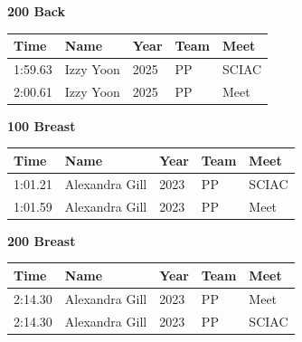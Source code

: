 \vspace{1.2em}
\noindent\begin{minipage}[t]{0.98\textwidth}
\centering
\textbf{\textcolor{teamprimary}{200 Back}}\par
\vspace{0.5em}
\centering
\small
\renewcommand{\arraystretch}{1.0}
\setlength{\tabcolsep}{4pt}
\begin{tabular}{@{}p{2.5cm}p{4.5cm}p{1.5cm}p{2.5cm}p{2.5cm}@{}}
\toprule
\textbf{Time} & \textbf{Name} & \textbf{Year} & \textbf{Team} & \textbf{Meet} \\
\midrule
1:59.63 & Izzy Yoon & 2025 & PP & SCIAC \\
2:00.61 & Izzy Yoon & 2025 & PP & Meet \\
\bottomrule
\end{tabular}
\end{minipage}
\vspace{1.2em}
\noindent\begin{minipage}[t]{0.98\textwidth}
\centering
\textbf{\textcolor{teamprimary}{100 Breast}}\par
\vspace{0.5em}
\centering
\small
\renewcommand{\arraystretch}{1.0}
\setlength{\tabcolsep}{4pt}
\begin{tabular}{@{}p{2.5cm}p{4.5cm}p{1.5cm}p{2.5cm}p{2.5cm}@{}}
\toprule
\textbf{Time} & \textbf{Name} & \textbf{Year} & \textbf{Team} & \textbf{Meet} \\
\midrule
1:01.21 & Alexandra Gill & 2023 & PP & SCIAC \\
1:01.59 & Alexandra Gill & 2023 & PP & Meet \\
\bottomrule
\end{tabular}
\end{minipage}
\vspace{1.2em}
\noindent\begin{minipage}[t]{0.98\textwidth}
\centering
\textbf{\textcolor{teamprimary}{200 Breast}}\par
\vspace{0.5em}
\centering
\small
\renewcommand{\arraystretch}{1.0}
\setlength{\tabcolsep}{4pt}
\begin{tabular}{@{}p{2.5cm}p{4.5cm}p{1.5cm}p{2.5cm}p{2.5cm}@{}}
\toprule
\textbf{Time} & \textbf{Name} & \textbf{Year} & \textbf{Team} & \textbf{Meet} \\
\midrule
2:14.30 & Alexandra Gill & 2023 & PP & Meet \\
2:14.30 & Alexandra Gill & 2023 & PP & SCIAC \\
\bottomrule
\end{tabular}
\end{minipage}
